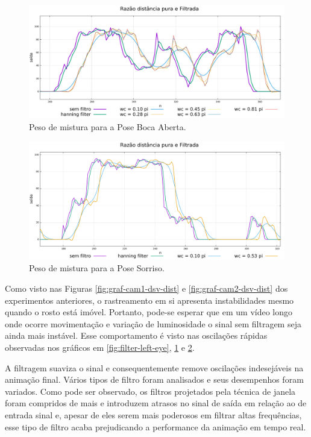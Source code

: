 \begin{figure}[!htb]
\centering
\includegraphics[width=1.0\textwidth]{figs/filter-result-left-eye.pdf} 
\caption{Peso de mistura para a Pose Boca Aberta.}
\label{fig:filter-open-mouth}
\end{figure}

\begin{figure}[!htb]
\centering
\includegraphics[width=1.0\textwidth]{figs/filter-result-smile.pdf} 
\caption{Peso de mistura para a Pose Sorriso.}
\label{fig:filter-smile}
\end{figure}

Como visto nas Figuras \ref{fig:graf-cam1-dsv-dist} e
\ref{fig:graf-cam2-dsv-dist} dos experimentos anteriores, o rastreamento em si
apresenta instabilidades mesmo quando o rosto está imóvel. Portanto, pode-se
esperar que em um vídeo longo onde ocorre movimentação e variação de
luminosidade o sinal sem filtragem seja ainda mais instável. Esse comportamento
é visto nas oscilações rápidas observadas nos gráficos em
\ref{fig:filter-left-eye}, \ref{fig:filter-open-mouth} e \ref{fig:filter-smile}. 

A filtragem suaviza o sinal e consequentemente remove oscilações indesejáveis na
animação final. Vários tipos de filtro foram analisados e seus desempenhos foram
variados. Como pode ser observado, os filtros projetados pela técnica de janela
foram compridos de mais e introduzem atrasos no sinal de saída em relação ao de
entrada sinal e, apesar de eles serem mais poderosos em filtrar altas
frequências, esse tipo de filtro acaba prejudicando a performance da animação em
tempo real. 

